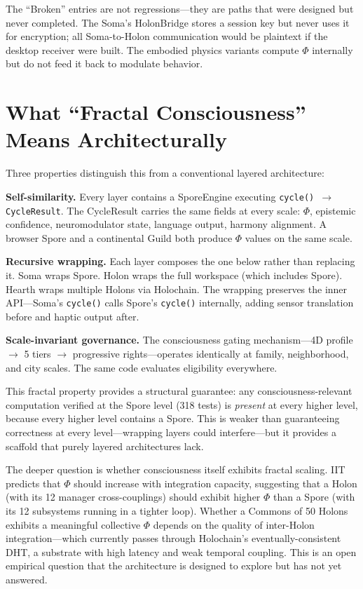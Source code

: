 \documentclass[12pt]{book}
\begin{document}
The ``Broken'' entries are not regressions---they are paths that were designed but never completed. The Soma's HolonBridge stores a session key but never uses it for encryption; all Soma-to-Holon communication would be plaintext if the desktop receiver were built. The embodied physics variants compute $\Phi$ internally but do not feed it back to modulate behavior.

\section{What ``Fractal Consciousness'' Means Architecturally}

Three properties distinguish this from a conventional layered architecture:

\textbf{Self-similarity.} Every layer contains a SporeEngine executing \texttt{cycle() $\to$ CycleResult}. The CycleResult carries the same fields at every scale: $\Phi$, epistemic confidence, neuromodulator state, language output, harmony alignment. A browser Spore and a continental Guild both produce $\Phi$ values on the same scale.

\textbf{Recursive wrapping.} Each layer composes the one below rather than replacing it. Soma wraps Spore. Holon wraps the full workspace (which includes Spore). Hearth wraps multiple Holons via Holochain. The wrapping preserves the inner API---Soma's \texttt{cycle()} calls Spore's \texttt{cycle()} internally, adding sensor translation before and haptic output after.

\textbf{Scale-invariant governance.} The consciousness gating mechanism---4D profile $\to$ 5 tiers $\to$ progressive rights---operates identically at family, neighborhood, and city scales. The same code evaluates eligibility everywhere.

This fractal property provides a structural guarantee: any consciousness-relevant computation verified at the Spore level (318 tests) is \textit{present} at every higher level, because every higher level contains a Spore. This is weaker than guaranteeing correctness at every level---wrapping layers could interfere---but it provides a scaffold that purely layered architectures lack.

The deeper question is whether consciousness itself exhibits fractal scaling. IIT predicts that $\Phi$ should increase with integration capacity, suggesting that a Holon (with its 12 manager cross-couplings) should exhibit higher $\Phi$ than a Spore (with its 12 subsystems running in a tighter loop). Whether a Commons of 50 Holons exhibits a meaningful collective $\Phi$ depends on the quality of inter-Holon integration---which currently passes through Holochain's eventually-consistent DHT, a substrate with high latency and weak temporal coupling. This is an open empirical question that the architecture is designed to explore but has not yet answered.
\end{document}

